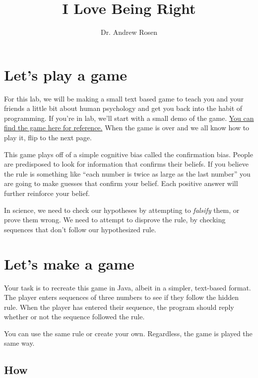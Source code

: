 \documentclass[10pt,letterpaper]{article}
\author{Dr. Andrew Rosen}
\title{I Love Being Right}
\date{}
\begin{document}
	
	\maketitle
	\section{Let's play a game}
	For this lab, we will be making a small text based game to teach you and your friends a little bit about human psychology and get you back into the habit of programming.
	If you're in lab, we'll start with a small demo of the game.
	\href{http://www.nytimes.com/interactive/2015/07/03/upshot/a-quick-puzzle-to-test-your-problem-solving.html?_r=0}{You can find the game here for reference.}
	When the game is over and we all know how to play it, flip to the next page.
	
	
	\newpage
	
	This game plays off of a simple cognitive bias called the confirmation bias. 
	People are predisposed to look for information that confirms their beliefs.
	If you believe the rule is something like ``each number is twice as large as the last number'' you are going to make guesses that confirm your belief.
	Each positive answer will further reinforce your belief.
	
	In science, we need to check our hypotheses by attempting to \textit{falsify} them, or prove them wrong.
	We need to attempt to disprove the rule, by checking sequences that don't follow our hypothesized rule.
	
	
	\newpage
	
	\section{Let's make a game}
	
	Your task is to recreate this game in Java, albeit in a simpler, text-based format.
	The player enters sequences of three numbers to see if they follow the hidden rule.
	When the player has entered their sequence, the program should reply whether or not the sequence followed the rule.
	
	You can use the same rule or create your own.  
	Regardless, the game is played the same way.
	
	\subsection{How}
	
\end{document}
